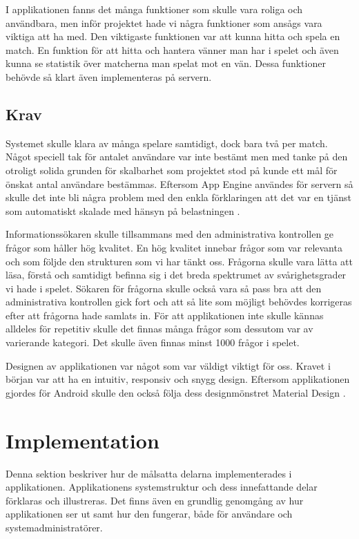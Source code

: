 \documentclass[a4paper, 11pt]{article}
\begin{document}
I applikationen fanns det många funktioner som skulle vara roliga och användbara, men inför projektet hade vi några funktioner som ansågs vara viktiga att ha med. Den viktigaste funktionen var att kunna hitta och spela en match. En funktion för att hitta och hantera vänner man har i spelet och även kunna se statistik över matcherna man spelat mot en vän. Dessa funktioner behövde så klart även implementeras på servern.

\subsection{Krav}
Systemet skulle klara av många spelare samtidigt, dock bara två per match. Något speciell tak för antalet användare var inte bestämt men med tanke på den otroligt solida grunden för skalbarhet som projektet stod på kunde ett mål för önskat antal användare bestämmas. Eftersom App Engine användes för servern så skulle det inte bli några problem med den enkla förklaringen att det var en tjänst som automatiskt skalade med hänsyn på belastningen \cite{appenginescalability}. 

Informationssökaren skulle tillsammans med den administrativa kontrollen ge frågor som håller hög kvalitet. En hög kvalitet innebar frågor som var relevanta och som följde den strukturen som vi har tänkt oss. Frågorna skulle vara lätta att läsa, förstå och samtidigt befinna sig i det breda spektrumet av svårighetsgrader vi hade i spelet. Sökaren för frågorna skulle också vara så pass bra att den administrativa kontrollen gick fort och att så lite som möjligt behövdes korrigeras efter att frågorna hade samlats in. För att applikationen inte skulle kännas alldeles för repetitiv skulle det finnas många frågor som dessutom var av varierande kategori. Det skulle även finnas minst 1000 frågor i spelet.

Designen av applikationen var något som var väldigt viktigt för oss. Kravet i början var att ha en intuitiv, responsiv och snygg design. Eftersom applikationen gjordes för Android skulle den också följa dess designmönstret Material Design \cite{MaterialDesign}.



\section{Implementation}
Denna sektion beskriver hur de målsatta delarna implementerades i applikationen. Applikationens systemstruktur och dess innefattande delar  förklaras och illustreras. Det finns även en grundlig genomgång av hur applikationen ser ut samt hur den fungerar, både för användare och systemadministratörer.
\end{document}
